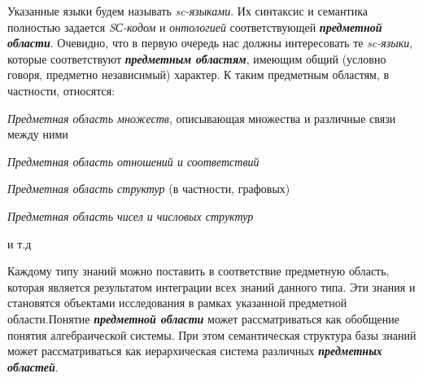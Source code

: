 \begin{SCn}
\begin{scnsubstruct}
{Указанные языки будем называть \textit{sc-языками}. Их синтаксис и семантика полностью задается \textit{SС-кодом} и \textit{онтологией} соответствующей \textbf{\textit{предметной области}}. Очевидно, что в первую очередь нас должны интересовать те \textit{sc-языки}, которые соответствуют \textbf{\textit{предметным областям}}, имеющим общий (условно говоря, предметно независимый) характер. К таким предметным областям, в частности, относятся:\begin{scnitemize}
\item \textit{Предметная область множеств}, описывающая множества и различные связи между ними\item \textit{Предметная область отношений и соответствий}\item \textit{Предметная область структур} (в частности, графовых)\item \textit{Предметная область чисел и числовых структур}\item и т.д\end{scnitemize}
Каждому типу знаний можно поставить в соответствие предметную область, которая является результатом интеграции всех знаний данного типа. Эти знания и становятся объектами исследования в рамках указанной предметной области.Понятие \textbf{\textit{предметной области}} может рассматриваться как обобщение понятия алгебраической системы. При этом семантическая структура базы знаний может рассматриваться как иерархическая система различных \textbf{\textit{предметных областей}}.}
\end{scnsubstruct}
\end{SCn}
